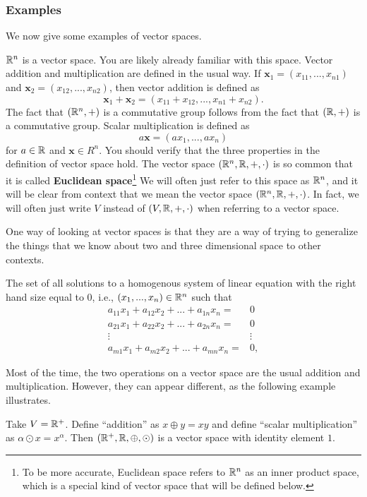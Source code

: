 \subsubsection{Examples}
We now give some examples of vector spaces. 
\begin{example} \label{ex:Rn}
  $\mathbb{R}^n$ is a vector space. You are likely already
  familiar with this space. Vector addition and multiplication are
  defined in the usual way. If $\mathbf{x}_1 = (x_{11}, ..., x_{n1})$
  and $\mathbf{x}_2 = (x_{12}, ..., x_{n2})$, then vector addition is
  defined as
  \[ \mathbf{x}_1 + \mathbf{x}_2 = (x_{11}+x_{12}, ... , x_{n1} +
  x_{n2}). \]
  The fact that $(\mathbb{R}^n,+)$ is a commutative group follows from the
  fact that $(\mathbb{R},+)$ is a commutative group. Scalar multiplication is
  defined as
  \[ a \mathbf{x} = (a x_1, ..., ax_n) \] for $a \in \mathbb{R}$ and
  $\mathbf{x} \in R^n$. You should verify that the three properties in
  the definition of vector space hold.  The vector space $(\mathbb{R}^n, \mathbb{R},
  +, \cdot)$ is so common that it is called \textbf{Euclidean
    space}\footnote{To be more accurate, Euclidean space refers to
    $\mathbb{R}^n$ as an inner product space, which is a special kind of
    vector space that will be defined below.} We will often just refer
  to this space as $\mathbb{R}^n$, and it will be clear from context that we
  mean the vector space $(\mathbb{R}^n, \mathbb{R}, + , \cdot)$. In fact, we will
  often just write $V$ instead of $(V,\mathbb{R},+,\cdot)$ when referring to a
  vector space.
\end{example}
One way of looking at vector spaces is that they are a way of trying
to generalize the things that we know about two and three dimensional
space to other contexts. 
\begin{example}
  The set of all solutions to a homogenous system of linear equation
  with the right hand size equal to $0$,
  i.e., $(x_1, ..., x_n) \in \mathbb{R}^n$ such that 
  \begin{align*}
    a_{11} x_1 + a_{12} x_2 + ... + a_{1n} x_n = & 0 \\
    a_{21} x_1 + a_{22} x_2 + ... + a_{2n} x_n = & 0 \\
    \vdots & \vdots \\
    a_{m1} x_1 + a_{m2} x_2 + ... + a_{mn} x_n = & 0 ,
  \end{align*}
\end{example}  
Most of the time, the two operations on a vector space are the usual
addition and multiplication. However, they can appear different, as the
following example illustrates.
\begin{example}
  Take $V = \mathbb{R}^+$. Define ``addition'' as $x \oplus y = xy$ and define
  ``scalar multiplication'' as $\alpha \odot x = x^\alpha$. Then
  $(\mathbb{R}^+,\mathbb{R}, \oplus, \odot)$ is a vector space with identity element
  $1$.   
\end{example}

